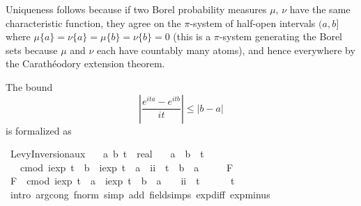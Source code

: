 \documentclass[leqno]{article}
\theoremstyle{definition}
\begin{document}
Uniqueness follows because if two Borel probability measures $\mu$, $\nu$ have the same characteristic function, they agree on the $\pi$-system of half-open intervals $(a,b]$ where $\mu \{a\} = \nu \{a\} = \mu \{b\} = \nu \{b\} = 0$ (this is a $\pi$-system generating the Borel sets because $\mu$ and $\nu$ each have countably many atoms), and hence everywhere by the Carath\'eodory extension theorem.

The bound
\[ \left|\frac{e^{ita} - e^{itb}}{it}\right| \le |b-a| \]
is formalized as

\medskip

\begin{isabellebody}
\isamarkupfalse%
\ Levy{\isacharunderscore}Inversion{\isacharunderscore}aux{}{\isacharcolon}\isanewline
\ \ \ a\ b\ t\ {\isacharcolon}{\isacharcolon}\ real\isanewline
\ \ \ {\isachardoublequoteopen}a\ {\isasymle}\ b{\isachardoublequoteclose}\ \ {\isachardoublequoteopen}t\ {\isasymnoteq}\ {}{\isachardoublequoteclose}\isanewline
\ \ \ {\isachardoublequoteopen}cmod\ {\isacharparenleft}{\isacharparenleft}iexp\ {\isacharparenleft}t\ {\isacharasterisk}\ b{\isacharparenright}\ {\isacharminus}\ iexp\ {\isacharparenleft}t\ {\isacharasterisk}\ a{\isacharparenright}{\isacharparenright}\ {\isacharslash}\ {\isacharparenleft}ii\ {\isacharasterisk}\ t{\isacharparenright}{\isacharparenright}\ {\isasymle}\ b\ {\isacharminus}\ a{\isachardoublequoteclose}\isanewline
\ \ \ \ {\isacharparenleft}\ {\isachardoublequoteopen}{\isacharquery}F\ {\isasymle}\ {\isacharunderscore}{\isachardoublequoteclose}{\isacharparenright}\isanewline
{}\isamarkupfalse%
\ {\isacharminus}\isanewline
\ \ \isamarkupfalse%
\ {\isachardoublequoteopen}{\isacharquery}F\ {\isacharequal}\ cmod\ {\isacharparenleft}iexp\ {\isacharparenleft}t\ {\isacharasterisk}\ a{\isacharparenright}\ {\isacharasterisk}\ {\isacharparenleft}iexp\ {\isacharparenleft}t\ {\isacharasterisk}\ {\isacharparenleft}b\ {\isacharminus}\ a{\isacharparenright}{\isacharparenright}\ {\isacharminus}\ {}{\isacharparenright}\ {\isacharslash}\ {\isacharparenleft}ii\ {\isacharasterisk}\ t{\isacharparenright}{\isacharparenright}{\isachardoublequoteclose}\isanewline
\ \ \ \ \isamarkupfalse%
\ {\isacharbackquoteopen}t\ {\isasymnoteq}\ {}{\isacharbackquoteclose}\ \isamarkupfalse%
\ {\isacharparenleft}intro\ arg{\isacharunderscore}cong{\isacharbrackleft}\ f{\isacharequal}norm{\isacharbrackright}{\isacharparenright}\ {\isacharparenleft}simp\ add{\isacharcolon}\ field{\isacharunderscore}simps\ exp{\isacharunderscore}diff\ exp{\isacharunderscore}minus{\isacharparenright}\isanewline

\end{isabellebody}
\end{document}
